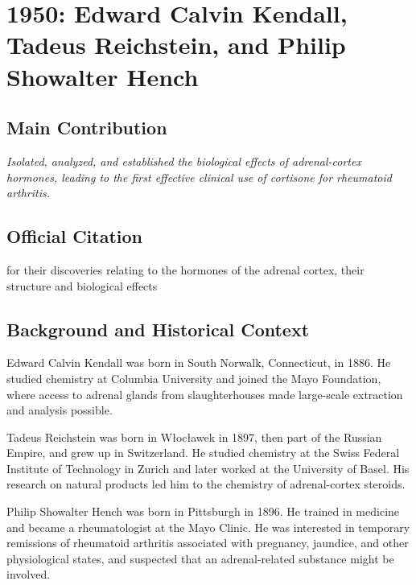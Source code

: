 \chapter[1950 --- Kendall, Reichstein, and Hench]{1950: Edward Calvin Kendall, Tadeus Reichstein, and Philip Showalter Hench}
\label{ch:1950_Kendall}

\section*{Main Contribution}

\textit{Isolated, analyzed, and established the biological effects of adrenal-cortex hormones, leading to the first effective clinical use of cortisone for rheumatoid arthritis.}\cite{nobel-1950,lecture-1950}

\section{Official Citation}

for their discoveries relating to the hormones of the adrenal cortex, their structure and biological effects

\section{Background and Historical Context}

Edward Calvin Kendall was born in South Norwalk, Connecticut, in 1886. He studied chemistry at Columbia University and joined the Mayo Foundation, where access to adrenal glands from slaughterhouses made large-scale extraction and analysis possible.

Tadeus Reichstein was born in W\l{}oc\l{}awek in 1897, then part of the Russian Empire, and grew up in Switzerland. He studied chemistry at the Swiss Federal Institute of Technology in Zurich and later worked at the University of Basel. His research on natural products led him to the chemistry of adrenal-cortex steroids.

Philip Showalter Hench was born in Pittsburgh in 1896. He trained in medicine and became a rheumatologist at the Mayo Clinic. He was interested in temporary remissions of rheumatoid arthritis associated with pregnancy, jaundice, and other physiological states, and suspected that an adrenal-related substance might be involved.

